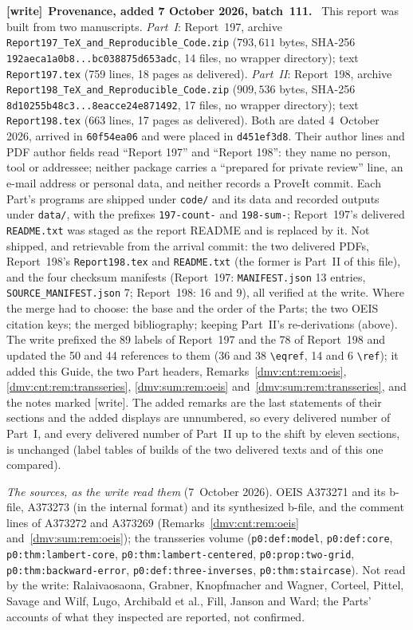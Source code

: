 \documentclass[11pt,letterpaper]{article}
\numberwithin{equation}{section}
\theoremstyle{definition}\newtheorem{definition}[theorem]{Definition}
\theoremstyle{remark}\newtheorem{remark}[theorem]{Remark}
\newcommand{\file}[1]{\nolinkurl{#1}}
\newenvironment{writenote}[1][]{\par\smallskip\begingroup\small
 \noindent\textbf{[write]}\if\relax\detokenize{#1}\relax\else~\textbf{#1.}\fi\ }%
 {\par\endgroup\smallskip}
\begin{document}
\begin{writenote}[Provenance, added 7 October 2026, batch~111]
This report was built from two manuscripts. \emph{Part~I}: Report~197,
archive \file{Report197_TeX_and_Reproducible_Code.zip} ($793{,}611$ bytes,
SHA-256 \file{192aeca1a0b8...bc038875d653adc}, 14 files, no wrapper
directory); text \file{Report197.tex} (759 lines, 18 pages as delivered).
\emph{Part~II}: Report~198, archive
\file{Report198_TeX_and_Reproducible_Code.zip} ($909{,}536$ bytes, SHA-256
\file{8d10255b48c3...8eacce24e871492}, 17 files, no wrapper directory); text
\file{Report198.tex} (663 lines, 17 pages as delivered). Both are dated
4~October 2026, arrived in \file{60f54ea06} and were placed in
\file{d451ef3d8}. Their author lines and PDF author fields read ``Report 197''
and ``Report 198'': they name no person, tool or addressee; neither package
carries a ``prepared for private review'' line, an e-mail address or personal
data, and neither records a ProveIt commit. Each Part's programs are shipped
under \file{code/} and its data and recorded outputs under \file{data/}, with
the prefixes \file{197-count-} and \file{198-sum-}; Report~197's delivered
\file{README.txt} was staged as the report README and is replaced by it. Not
shipped, and retrievable from the arrival commit: the two delivered PDFs,
Report~198's \file{Report198.tex} and \file{README.txt} (the former is
Part~II of this file), and the four checksum manifests (Report~197:
\file{MANIFEST.json} 13 entries, \file{SOURCE_MANIFEST.json} 7; Report~198:
16 and 9), all verified at the write. Where the merge had to choose: the
base and the order of the Parts; the two OEIS citation keys; the merged
bibliography; keeping Part~II's re-derivations (above). The write prefixed
the 89 labels of Report~197 and the 78 of Report~198 and updated the 50 and
44 references to them (36 and 38 \verb|\eqref|, 14 and 6 \verb|\ref|); it
added this Guide, the two Part headers, Remarks~\ref{dmv:cnt:rem:oeis},
\ref{dmv:cnt:rem:transseries}, \ref{dmv:sum:rem:oeis}
and~\ref{dmv:sum:rem:transseries}, and the notes marked [write]. The added
remarks are the last statements of their sections and the added displays
are unnumbered, so every delivered number of Part~I, and every delivered
number of Part~II up to the shift by eleven sections, is unchanged (label
tables of builds of the two delivered texts and of this one compared).

\emph{The sources, as the write read them} (7~October 2026). OEIS A373271
and its b-file, A373273 (in the internal format) and its synthesized
b-file, and the comment lines of A373272 and A373269
(Remarks~\ref{dmv:cnt:rem:oeis} and~\ref{dmv:sum:rem:oeis}); the
transseries volume
(\file{p0:def:model}, \file{p0:def:core}, \file{p0:thm:lambert-core},
\file{p0:thm:lambert-centered}, \file{p0:prop:two-grid},
\file{p0:thm:backward-error}, \file{p0:def:three-inverses},
\file{p0:thm:staircase}). Not read by the write: Ralaivaosaona, Grabner,
Knopfmacher and Wagner, Corteel, Pittel, Savage and Wilf, Lugo, Archibald
et al., Fill, Janson and Ward; the Parts' accounts of what they inspected
are reported, not confirmed.


\end{writenote}
\end{document}
